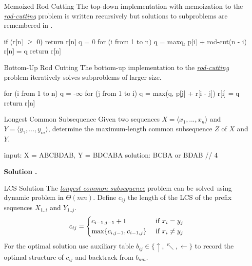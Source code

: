\documentclass{cognito}
\begin{document}
\begin{note}{Memoized Rod Cutting}
	The top-down implementation  with memoization to the \hyperref[note:Rod Cutting Problem]{\it rod-cutting} problem
	 is written recursively but solutions to subproblems are remembered in .
	 
	 \begin{largecode}
 if (r[n] $\geq$ 0) return r[n]
 q = 0
 for (i from 1 to n)
	q = max{q, p[i] + rod-cut(n - i)}
 r[n] = q
 return r[n]
	\end{largecode}
	\vspace{-5pt}
\end{note}

\begin{note}{Bottom-Up Rod Cutting}
	The bottom-up implementation  to the \hyperref[note:Rod Cutting Problem]{\it rod-cutting} problem
	 iteratively solves subproblems of larger size. 
	 
	 \begin{largecode}
 for (i from 1 to n)
 	q = -$\infty$
	for (j from 1 to i)
		q = max(q, p[j] + r[i - j])
	r[i] = q
 return r[n]
	\end{largecode}
	\vspace{-5pt}
\end{note}

\begin{note}{Longest Common Subsequence}
	Given two sequences $X = \langle x_1, ..., x_n \rangle$ and $Y = \langle y_1, ..., y_m \rangle $, determine the maximum-length common subsequence $Z$ of $X$ and $Y$.
	\begin{largecode}
 input:    X = ABCBDAB, Y = BDCABA
 solution: BCBA or BDAB  // 4
	\end{largecode}
	\bf Solution \hyperref[note:LCS Solution]{\solutionref}.
\end{note}

\begin{note}{LCS Solution}
	The \hyperref[note:Longest Common Subsequence]{\it longest common subsequence} problem can be solved using dynamic problem in $\Theta(mn)$.
	Define $c_{ij}$ the length of the LCS of the prefix sequences $X_{1..i}$ and $Y_{1..j}$.
	$$
		c_{ij} = \begin{dcases}
			c_{i-1,j-1} + 1 & \text{ if } x_i = y_j\\
			\max\{ c_{i,j-1}, c_{i-1,j} \} & \text{ if } x_i \neq y_j
		\end{dcases}
	$$
	For the optimal solution use auxiliary table $b_{ij} \in \{\uparrow, \nwarrow, \leftarrow \}$ to record
	the optimal structure of $c_{ij}$ and backtrack from $b_{nm}$.
\end{note}
\end{document}
